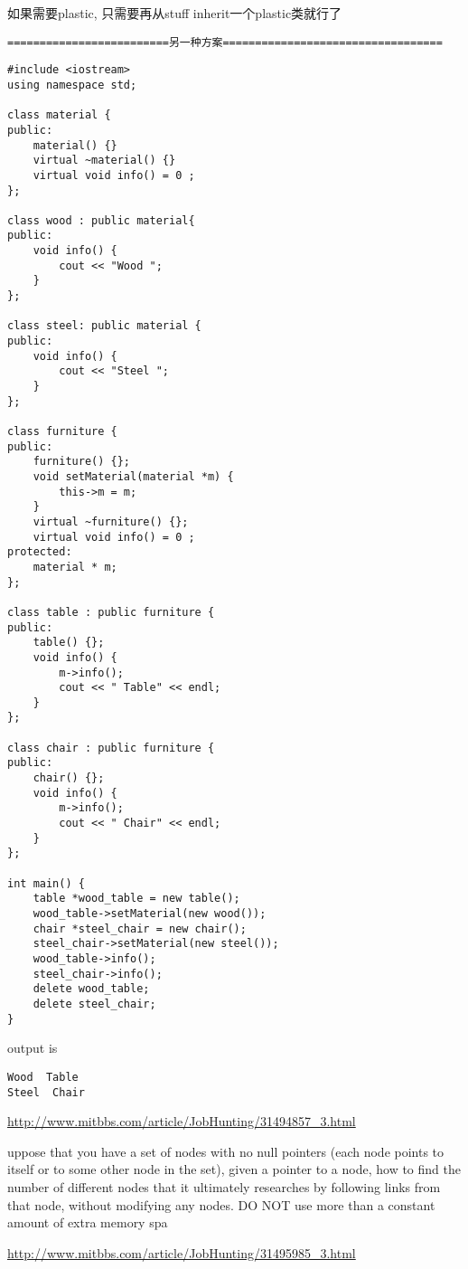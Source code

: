 \documentclass[12pt]{book}
\begin{document}
如果需要plastic, 只需要再从stuff inherit一个plastic类就行了

\texttt{=========================另一种方案==================================}
\lstset{language=java,label= ,caption= ,numbers=none}
\begin{lstlisting}
#include <iostream>
using namespace std;

class material {
public:
    material() {}
    virtual ~material() {}
    virtual void info() = 0 ; 
};

class wood : public material{
public:
    void info() {
        cout << "Wood ";
    }
};

class steel: public material {
public:
    void info() {
        cout << "Steel ";
    }
};

class furniture {
public:
    furniture() {};
    void setMaterial(material *m) {
        this->m = m;
    }
    virtual ~furniture() {};
    virtual void info() = 0 ;
protected:
    material * m;
};

class table : public furniture {
public:
    table() {};
    void info() {
        m->info();
        cout << " Table" << endl;
    }
};

class chair : public furniture {
public:
    chair() {};
    void info() {
        m->info();
        cout << " Chair" << endl;
    }
};

int main() {
    table *wood_table = new table();
    wood_table->setMaterial(new wood());
    chair *steel_chair = new chair();
    steel_chair->setMaterial(new steel());
    wood_table->info();
    steel_chair->info();
    delete wood_table;
    delete steel_chair;
}
\end{lstlisting}

output is

\lstset{language=java,label= ,caption= ,numbers=none}
\begin{lstlisting}
Wood  Table
Steel  Chair
\end{lstlisting}

\url{http://www.mitbbs.com/article/JobHunting/31494857_3.html}

uppose that you have a set of nodes with no null pointers (each node points
to itself or to some other node in the set), given a pointer to a node, how
to find the number of different nodes that it ultimately researches by 
following links from that node, without modifying any nodes. DO NOT use more
than a constant amount of extra memory spa

\url{http://www.mitbbs.com/article/JobHunting/31495985_3.html}
\end{document}
